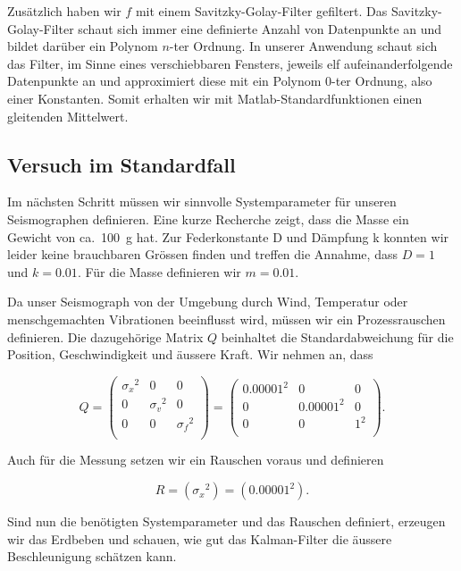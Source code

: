 Zusätzlich haben wir $f$ mit einem Savitzky-Golay-Filter gefiltert.
Das Savitzky-Golay-Filter schaut sich immer eine definierte Anzahl von Datenpunkte an
und bildet  darüber ein Polynom $n$-ter Ordnung.
In unserer Anwendung schaut sich das Filter, im Sinne eines verschiebbaren Fensters,
jeweils elf aufeinanderfolgende Datenpunkte an
und approximiert diese mit ein Polynom $0$-ter Ordnung,
also einer Konstanten.
Somit erhalten wir mit Matlab-Standardfunktionen einen gleitenden Mittelwert.

\subsection{Versuch im Standardfall}
Im nächsten Schritt müssen wir sinnvolle Systemparameter für unseren Seismographen definieren.
Eine kurze Recherche zeigt, dass die Masse ein Gewicht von ca.\ \SI{100}{\gram} hat.
Zur Federkonstante D und Dämpfung k konnten wir leider keine brauchbaren Grössen finden und treffen die Annahme, dass $D = 1$ und $k = 0.01$.
Für die Masse definieren wir $m = 0.01$.

Da unser Seismograph von der Umgebung durch Wind, Temperatur oder menschgemachten Vibrationen beeinflusst wird, müssen wir ein Prozessrauschen definieren.
Die dazugehörige Matrix $Q$ beinhaltet die Standardabweichung für die Position, Geschwindigkeit und äussere Kraft.
Wir nehmen an, dass

\begin{equation}
	Q = \left(
	\begin{array}{ccc}
		{\sigma_x }^2& 0& 0 \\
		0 & {\sigma_v }^2& 0\\
		0 & 0& {\sigma_f }^2\\
	\end{array}\right)= \left(
	\begin{array}{ccc}
		{0.00001}^2& 0& 0 \\
		0 & {0.00001}^2& 0\\
		0 & 0& {1 }^2\\
	\end{array}\right).
\end{equation}

Auch für die Messung setzen wir ein Rauschen voraus und definieren

\begin{equation}
R= ({\sigma_x}^2)=
({0.00001}^2).
\end{equation}

Sind nun die benötigten Systemparameter und das Rauschen definiert, erzeugen wir das Erdbeben und schauen, wie gut das Kalman-Filter die äussere Beschleunigung schätzen kann.

